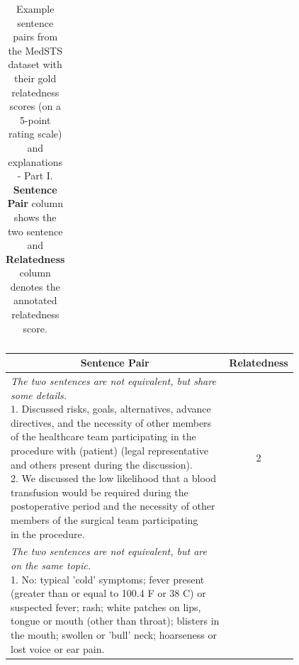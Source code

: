 \begin{enumerate}
\begin{table}[ht!]
\begin{tabular}{l|c}
		\end{tabular}
		\caption[Example sentence pairs from the MedSTS dataset - Part I]{Example sentence pairs from the MedSTS dataset with their gold relatedness scores (on a 5-point rating scale) and explanations - Part I. \textbf{Sentence Pair} column shows the two sentence and \textbf{Relatedness} column denotes the annotated relatedness score.}
		\label{tab:medstsdata_1}
	\end{table} 




\begin{table}[ht!]
	\centering 	
	\begin{tabular}{l|c} 
		\hline
		\multicolumn{1}{c|}{\textbf{Sentence Pair}} & 
		\multicolumn{1}{c}{\textbf{Relatedness}}  \\
		\hline
		\makecell[l]
		{\textit{The two sentences are not equivalent, but share } \\
			\textit{some details.} \\
			1. Discussed risks, goals, alternatives, advance \\ directives, and the necessity of other members \\ of the healthcare team participating in the \\ procedure with (patient) (legal representative \\ and others present during the discussion). \\ 
			2. We discussed the low likelihood that a blood \\ transfusion would be required during the \\ postoperative period and the necessity of other \\ members of the surgical team participating \\ in the procedure.
} & 2  \\
		\hline
		\makecell[l]
		{\textit{The two sentences are not equivalent, but are } \\
			\textit{on the same topic.} \\
			1. No: typical 'cold' symptoms; fever present \\ (greater than or equal to 100.4 F or 38 C) or \\ suspected fever; rash; white patches on lips, \\ tongue or mouth (other than throat); blisters in \\ the mouth; swollen or 'bull' neck; hoarseness or \\ lost voice or ear pain. \\ 
}
\end{tabular}
\end{table}
\end{enumerate}
